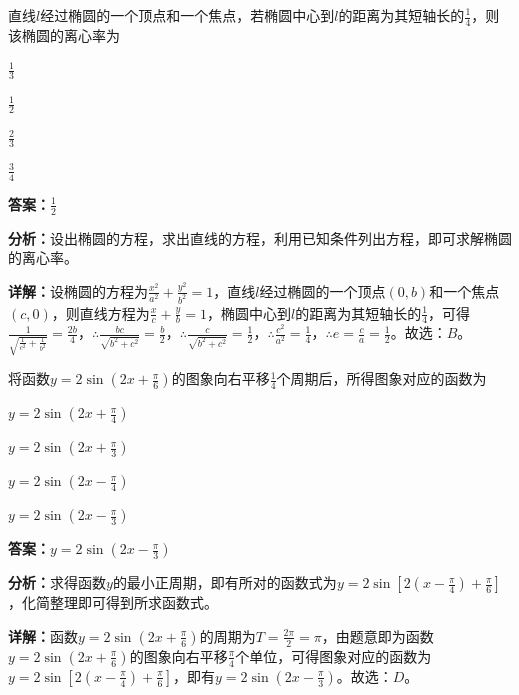 \begin{question}[points=5]
直线$l$经过椭圆的一个顶点和一个焦点，若椭圆中心到$l$的距离为其短轴长的$\frac{1}{4}$，则该椭圆的离心率为
\begin{choices}
  \item $\frac{1}{3}$
  \item $\frac{1}{2}$
  \item $\frac{2}{3}$
  \item $\frac{3}{4}$
\end{choices}
\begin{solution}
\textbf{答案：}$\frac{1}{2}$

\textbf{分析：}设出椭圆的方程，求出直线的方程，利用已知条件列出方程，即可求解椭圆的离心率。

\textbf{详解：}设椭圆的方程为$\frac{x^2}{a^2}+\frac{y^2}{b^2}=1$，直线$l$经过椭圆的一个顶点$(0,b)$和一个焦点$(c,0)$，则直线方程为$\frac{x}{c}+\frac{y}{b}=1$，椭圆中心到$l$的距离为其短轴长的$\frac{1}{4}$，可得$\frac{1}{\sqrt{\frac{1}{c^2}+\frac{1}{b^2}}}=\frac{2b}{4}$，$\therefore \frac{bc}{\sqrt{b^2+c^2}}=\frac{b}{2}$，$\therefore \frac{c}{\sqrt{b^2+c^2}}=\frac{1}{2}$，$\therefore \frac{c^2}{a^2}=\frac{1}{4}$，$\therefore e=\frac{c}{a}=\frac{1}{2}$。故选：$B$。
\end{solution}
\end{question}

\begin{question}[points=5]
将函数$y=2\sin(2x+\frac{\pi}{6})$的图象向右平移$\frac{1}{4}$个周期后，所得图象对应的函数为
\begin{choices}
  \item $y=2\sin(2x+\frac{\pi}{4})$
  \item $y=2\sin(2x+\frac{\pi}{3})$
  \item $y=2\sin(2x-\frac{\pi}{4})$
  \item $y=2\sin(2x-\frac{\pi}{3})$
\end{choices}
\begin{solution}
\textbf{答案：}$y=2\sin(2x-\frac{\pi}{3})$

\textbf{分析：}求得函数$y$的最小正周期，即有所对的函数式为$y=2\sin[2(x-\frac{\pi}{4})+\frac{\pi}{6}]$，化简整理即可得到所求函数式。

\textbf{详解：}函数$y=2\sin(2x+\frac{\pi}{6})$的周期为$T=\frac{2\pi}{2}=\pi$，由题意即为函数$y=2\sin(2x+\frac{\pi}{6})$的图象向右平移$\frac{\pi}{4}$个单位，可得图象对应的函数为$y=2\sin[2(x-\frac{\pi}{4})+\frac{\pi}{6}]$，即有$y=2\sin(2x-\frac{\pi}{3})$。故选：$D$。
\end{solution}
\end{question}

